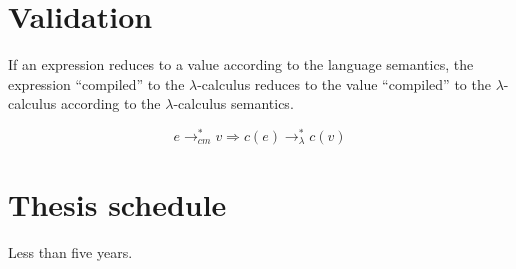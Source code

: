 \documentclass[ms]{byuprop}
\begin{document}
\section{Validation}

If an expression reduces to a value according to the language semantics, the expression ``compiled'' to the $\lambda$-calculus reduces to the value ``compiled'' to the $\lambda$-calculus according to the $\lambda$-calculus semantics.

\[
e\rightarrow^{*}_{cm}v\Rightarrow c(e)\rightarrow^{*}_{\lambda}c(v)
\]

\section{Thesis schedule}

Less than five years.





\end{document}
